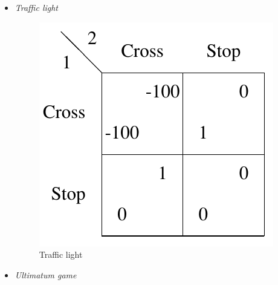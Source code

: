\begin{itemize}
  \item \emph{Traffic light}

    \begin{figure}[H]
      \centering
      \includegraphics[width=\widthratio\paperwidth]{../img/traffic-light.png}
      \caption{Traffic light}
      \label{fig:traffic-light}
    \end{figure}

  \item \emph{Ultimatum game}
\end{itemize}
